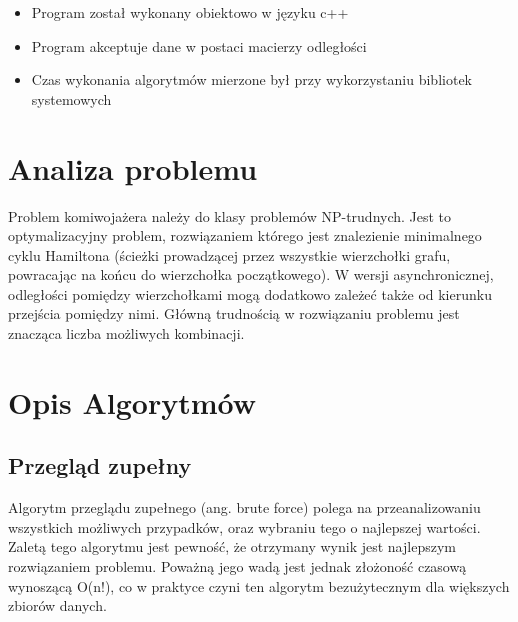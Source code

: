 \documentclass{article}
\begin{document}
\begin{itemize}
\item Program został wykonany obiektowo w języku c++
\item Program akceptuje dane w postaci macierzy odległości
\item Czas wykonania algorytmów mierzone był przy wykorzystaniu
bibliotek systemowych
\end{itemize}

\section{Analiza problemu}

Problem komiwojażera należy do klasy problemów NP-trudnych. Jest to
optymalizacyjny problem, rozwiązaniem którego jest znalezienie minimalnego cyklu Hamiltona
(ścieżki prowadzącej przez wszystkie wierzchołki grafu, powracając na końcu do wierzchołka
początkowego). W wersji asynchronicznej, odległości pomiędzy
wierzchołkami mogą dodatkowo zależeć także od kierunku przejścia pomiędzy nimi. Główną
trudnością w rozwiązaniu problemu jest znacząca liczba możliwych kombinacji.


\section{Opis Algorytmów}

\subsection{Przegląd zupełny}

Algorytm przeglądu zupełnego (ang. brute force) polega na przeanalizowaniu wszystkich
możliwych przypadków, oraz wybraniu tego o najlepszej wartości. Zaletą tego algorytmu jest pewność,
że otrzymany wynik jest najlepszym rozwiązaniem problemu. Poważną jego wadą jest jednak
złożoność czasową wynoszącą O(n!), co w praktyce czyni ten algorytm bezużytecznym dla większych
zbiorów danych.
\end{document}
